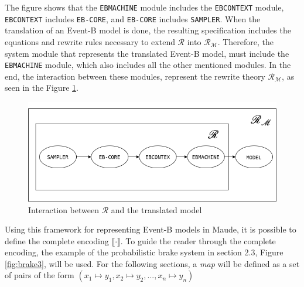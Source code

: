 The figure shows that the \texttt{EBMACHINE} module includes the \texttt{EBCONTEXT} module, \texttt{EBCONTEXT} includes \texttt{EB-CORE}, and \texttt{EB-CORE} includes  \texttt{SAMPLER}. When the translation of an Event-B model is done, the resulting specification includes the equations and rewrite rules necessary to extend $\mathscr{R}$ into $\mathscr{R}_\mathscr{M}$. Therefore, the system module that represents the translated Event-B model, must include the \texttt{EBMACHINE} module, which also includes all the other mentioned modules. In the end, the interaction between these modules, represent the rewrite theory $\mathscr{R}_\mathscr{M}$, as seen in the Figure \ref{fig:E2M2}.
\begin{figure}[h]
    \centering
    \includegraphics[scale = 0.5]{images/E2M2.png}
    \caption{Interaction between $\mathscr{R}$ and the translated model}
    \label{fig:E2M2}
\end{figure}
Using this framework for representing Event-B models in Maude, it is possible to define the complete encoding $\llbracket \cdot \rrbracket$. To guide the reader through the complete encoding, the example of the probabilistic brake system in section 2.3, Figure \ref{fig:brake3}, will be used. For the following sections, a \textit{map} will be defined as a set of pairs of the form $(x_1 \mapsto y_1, x_2 \mapsto y_2, ... , x_n \mapsto y_n)$

